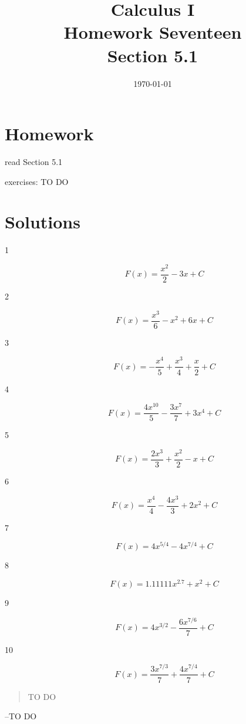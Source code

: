\documentclass[letterpaper, landscape]{exam}
\title{Calculus I \\ Homework Seventeen \\ Section 5.1}
\author{}
\date{\today}
\begin{document}
  \maketitle

  \section{Homework}
    \begin{itemize*}
      \item read Section 5.1
      \item exercises: TO DO
    \end{itemize*}

  \ifprintanswers

  \section{Solutions}

  \begin{description}

    \item[1] 
      \[
        F(x) = \frac{x^2}{2} - 3x + C
      \]

    \item[2] 
      \[
        F(x) = \frac{x^3}{6} - x^2 + 6x + C
      \]

    \item[3] 
      \[
        F(x) = - \frac{x^4}{5} + \frac{x^3}{4} + \frac{x}{2} + C
      \]

    \item[4] 
      \[
        F(x) = \frac{4x^{10}}{5} - \frac{3x^7}{7} + 3x^4 + C
      \]

    \item[5] 
      \[
        F(x) = \frac{2x^3}{3} + \frac{x^2}{2} - x + C
      \]

    \item[6] 
      \[
        F(x) = \frac{x^4}{4} - \frac{4x^3}{3} + 2x^2 + C
      \]

    \item[7] 
      \[
        F(x) = 4x^{5/4} - 4x^{7/4} + C
      \]

    \item[8] 
      \[
        F(x) = 1.11111x^{2.7} + x^2 + C
      \]

    \item[9] 
      \[
        F(x) = 4x^{3/2} - \frac{6x^{7/6}}{7} + C
      \]

    \item[10] 
      \[
        F(x) = \frac{3x^{7/3}}{7} + \frac{4x^{7/4}}{7} + C
      \]

  \end{description}

  \else
    \vspace{9 cm}
    \begin{quote}
      \begin{em}
        TO DO
      \end{em}
    \end{quote}
    \hspace{2 cm} --TO DO
  \fi
\end{document}
